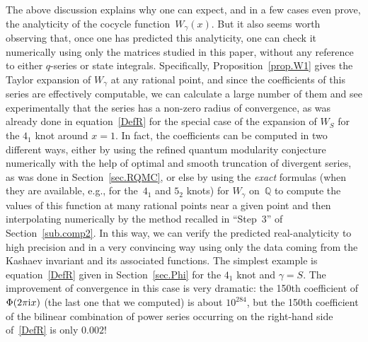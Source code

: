 \documentclass[pdftex]{sigma}
\numberwithin{equation}{section}
\def\Q{\mathbb Q}
\def\g{\gamma}
\begin{document}
The above discussion explains why one can expect, and in a few cases even prove,
the analyticity of the cocycle function~$W_\g(x)$. But it also seems worth observing
that, once one has predicted this analyticity, one can check it numerically using
only the matrices studied in this paper, without any reference to either $q$-series
or state integrals. Specifically, Proposition~\ref{prop.W1} gives the Taylor expansion
of $W_\g$ at any rational point, and since the coefficients of this series are
effectively computable, we can calculate a large number of them and see experimentally
that the series has a non-zero radius of convergence, as was already done in
equation~\eqref{DefR} for the special case of the expansion of $W_S$ for the $4_1$
knot around $x=1$. In fact, the coefficients can be computed in two different ways,
either by using the refined quantum modularity conjecture numerically with the help
of optimal and smooth truncation of divergent series, as was done in
Section~\ref{sec.RQMC}, or else by using the \emph{exact} formulas (when they are
available, e.g., for the~$4_1$ and $5_2$ knots) for $W_\g$ on~$\Q$ to compute the values
of this function at many rational points near a given point and then interpolating
numerically by the method recalled in ``Step~3'' of Section~\ref{sub.comp2}.
In this way, we can
verify the predicted real-analyticity to high precision and in a very convincing way
using only the data coming from the Kashaev invariant and its associated functions.
The simplest example is equation~\eqref{DefR} given in Section~\ref{sec.Phi} for the
$4_1$ knot and $\g=S$. The improvement of convergence in this case is very dramatic:
the 150th coefficient of $\Phi(2\pi {\rm i}x)$ (the last one that we computed) is about
$10^{284}$, but the 150th coefficient of the bilinear combination of power series
occurring on the right-hand side of~\eqref{DefR} is only $0.002 $!
\end{document}
